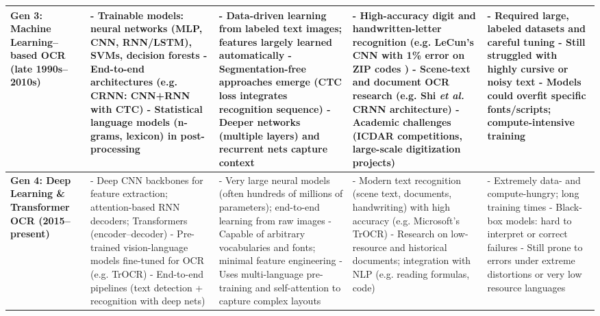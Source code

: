 \begin{table}[tb!]
{\begin{tabular}{|p{3.2cm}|p{4.5cm}|p{4.8cm}|p{4.8cm}|p{4.8cm}|}
\hline

\textbf{Gen 3: Machine Learning–based OCR (late 1990s–2010s)} & 
- Trainable models: neural networks (MLP, CNN, RNN/LSTM), SVMs, decision forests \cite{lecun1998gradient, graves2009offline} \newline 
- End-to-end architectures (e.g. CRNN: CNN+RNN with CTC) \cite{shi2017crnn} \newline 
- Statistical language models (n-grams, lexicon) in post-processing & 
- Data-driven learning from labeled text images; features largely learned automatically \newline 
- Segmentation-free approaches emerge (CTC loss integrates recognition sequence) \cite{shi2017crnn} \newline 
- Deeper networks (multiple layers) and recurrent nets capture context \cite{graves2009offline} & 
- High-accuracy digit and handwritten-letter recognition (e.g. LeCun’s CNN with 1\% error on ZIP codes \cite{lecun1998gradient}) \newline 
- Scene-text and document OCR research (e.g. Shi \textit{et al.} CRNN architecture) \newline 
- Academic challenges (ICDAR competitions, large-scale digitization projects) & 
- Required large, labeled datasets and careful tuning \newline 
- Still struggled with highly cursive or noisy text \newline 
- Models could overfit specific fonts/scripts; compute-intensive training \\

\hline

\textbf{Gen 4: Deep Learning \& Transformer OCR (2015–present)} & 
- Deep CNN backbones for feature extraction; attention-based RNN decoders; Transformers (encoder–decoder) \cite{li2021trocr} \newline 
- Pre-trained vision-language models fine-tuned for OCR (e.g. TrOCR) \newline 
- End-to-end pipelines (text detection + recognition with deep nets) & 
- Very large neural models (often hundreds of millions of parameters); end-to-end learning from raw images \newline 
- Capable of arbitrary vocabularies and fonts; minimal feature engineering \newline 
- Uses multi-language pre-training and self-attention to capture complex layouts & 
- Modern text recognition (scene text, documents, handwriting) with high accuracy (e.g. Microsoft’s TrOCR) \newline 
- Research on low-resource and historical documents; integration with NLP (e.g. reading formulas, code) & 
- Extremely data- and compute-hungry; long training times \newline 
- Black-box models: hard to interpret or correct failures \newline 
- Still prone to errors under extreme distortions or very low resource languages \\


\end{tabular}}
\end{table}
